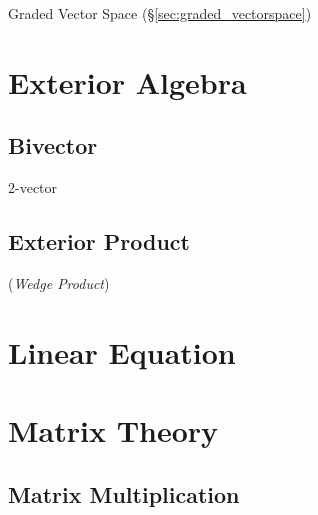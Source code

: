 Graded Vector Space (\S\ref{sec:graded_vectorspace})



\section{Exterior Algebra}\label{sec:exterior_algebra}

\subsection{Bivector}\label{sec:bivector}

$2$-vector



\subsection{Exterior Product}\label{sec:exterior_product}

(\emph{Wedge Product})



\section{Linear Equation}\label{sec:linear_equation}

\section{Matrix Theory}\label{sec:matrix_theory}

\subsection{Matrix Multiplication}\label{sec:matrix_multiplication}

